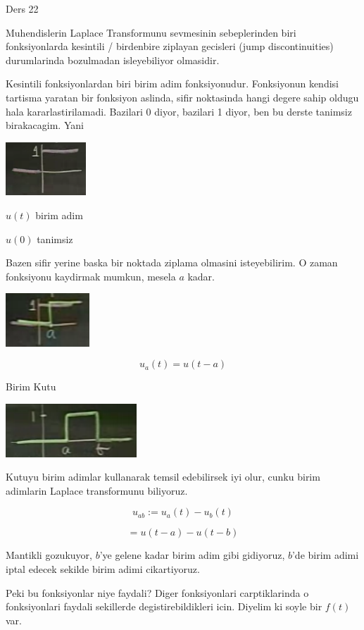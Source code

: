 \documentclass[12pt,fleqn]{article}
\begin{document}
Ders 22

Muhendislerin Laplace Transformunu sevmesinin sebeplerinden biri
fonksiyonlarda kesintili / birdenbire ziplayan gecisleri (jump
discontinuities) durumlarinda bozulmadan isleyebiliyor olmasidir. 

Kesintili fonksiyonlardan biri birim adim fonksiyonudur. Fonksiyonun
kendisi tartisma yaratan bir fonksiyon aslinda, sifir noktasinda hangi
degere sahip oldugu hala kararlastirilamadi. Bazilari 0 diyor, bazilari 1
diyor, ben bu derste tanimsiz birakacagim. Yani

\includegraphics[height=2cm]{22_1.png}

$u(t)$ birim adim

$u(0)$ tanimsiz

Bazen sifir yerine baska bir noktada ziplama olmasini isteyebilirim. O
zaman fonksiyonu kaydirmak mumkun, mesela $a$ kadar. 

\includegraphics[height=2cm]{22_2.png}

\[ u_a(t) = u(t-a) \]

Birim Kutu

\includegraphics[height=2cm]{22_3.png}

Kutuyu birim adimlar kullanarak temsil edebilirsek iyi olur, cunku
birim adimlarin Laplace transformunu biliyoruz. 

\[ u_{ab} := u_a(t) - u_b(t) \]

\[ = u(t-a) - u(t-b) \]

Mantikli gozukuyor, $b$'ye gelene kadar birim adim gibi gidiyoruz, $b$'de
birim adimi iptal edecek sekilde birim adimi cikartiyoruz. 

Peki bu fonksiyonlar niye faydali? Diger fonksiyonlari carptiklarinda o
fonksiyonlari faydali sekillerde degistirebildikleri icin. Diyelim ki soyle
bir $f(t)$ var.
\end{document}
